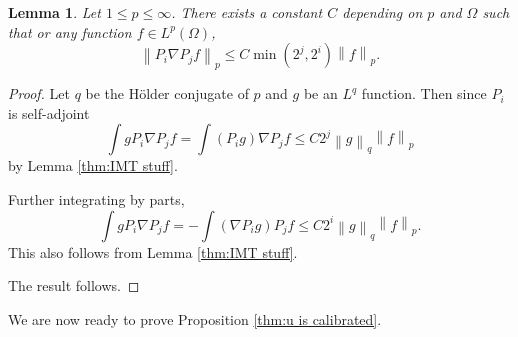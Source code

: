 \documentclass[11pt]{amsart}
\newtheorem{lemma}[theorem]{Lemma}
\theoremstyle{remark}
\theoremstyle{definition}
\newcommand{\norm}[1]{\left\lVert#1\right\rVert}
\newcommand{\grad}{\nabla}
\begin{document}
\begin{lemma} \label{thm:grad and proj}
Let $1 \leq p \leq \infty$.  There exists a constant $C$ depending on $p$ and $\Omega$ such that or any function $f \in L^p(\Omega)$,
\[ \norm{P_i \grad P_j f}_p \leq C \min(2^j,2^i) \norm{f}_p. \]
\end{lemma}
\begin{proof}
Let $q$ be the H\"{o}lder conjugate of $p$ and $g$ be an $L^q$ function.  Then since $P_i$ is self-adjoint
\[ \int g P_i \grad P_j f = \int (P_i g) \grad P_j f \leq C 2^j \norm{g}_q \norm{f}_p \]
by Lemma \ref{thm:IMT stuff}.  

Further integrating by parts,
\[ \int g P_i \grad P_j f = - \int (\grad P_i g) P_j f \leq C 2^i \norm{g}_q \norm{f}_p. \]
This also follows from Lemma \ref{thm:IMT stuff}.  

The result follows.  
\end{proof}

We are now ready to prove Proposition \ref{thm:u is calibrated}.  
\end{document}
